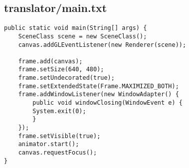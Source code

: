 \subsection*{translator/main.txt}
\begin{lstlisting}
public static void main(String[] args) {
    SceneClass scene = new SceneClass();
    canvas.addGLEventListener(new Renderer(scene));

    frame.add(canvas);
    frame.setSize(640, 480);
    frame.setUndecorated(true);
    frame.setExtendedState(Frame.MAXIMIZED_BOTH);
    frame.addWindowListener(new WindowAdapter() {
	    public void windowClosing(WindowEvent e) {
		System.exit(0);
	    }
	});
    frame.setVisible(true);
    animator.start();
    canvas.requestFocus();
}\end{lstlisting}

